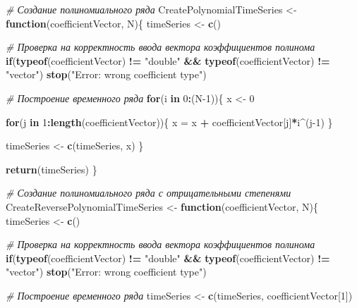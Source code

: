 \documentclass[
]{article}
\newenvironment{Shaded}{\begin{snugshade}}{\end{snugshade}}
\newcommand{\CommentTok}[1]{\textcolor[rgb]{0.56,0.35,0.01}{\textit{#1}}}
\newcommand{\ControlFlowTok}[1]{\textcolor[rgb]{0.13,0.29,0.53}{\textbf{#1}}}
\newcommand{\DecValTok}[1]{\textcolor[rgb]{0.00,0.00,0.81}{#1}}
\newcommand{\FunctionTok}[1]{\textcolor[rgb]{0.13,0.29,0.53}{\textbf{#1}}}
\newcommand{\NormalTok}[1]{#1}
\newcommand{\OtherTok}[1]{\textcolor[rgb]{0.56,0.35,0.01}{#1}}
\newcommand{\SpecialCharTok}[1]{\textcolor[rgb]{0.81,0.36,0.00}{\textbf{#1}}}
\newcommand{\StringTok}[1]{\textcolor[rgb]{0.31,0.60,0.02}{#1}}
\begin{document}
\begin{Shaded}
\begin{Highlighting}[]
\CommentTok{\# Создание полиномиального ряда}
\NormalTok{CreatePolynomialTimeSeries }\OtherTok{\textless{}{-}} \ControlFlowTok{function}\NormalTok{(coefficientVector, N)\{}
\NormalTok{  timeSeries }\OtherTok{\textless{}{-}} \FunctionTok{c}\NormalTok{()}
  
  \CommentTok{\# Проверка на корректность ввода вектора коэффициентов полинома}
  \ControlFlowTok{if}\NormalTok{(}\FunctionTok{typeof}\NormalTok{(coefficientVector) }\SpecialCharTok{!=} \StringTok{"double"} \SpecialCharTok{\&\&} \FunctionTok{typeof}\NormalTok{(coefficientVector) }\SpecialCharTok{!=} \StringTok{"vector"}\NormalTok{) }\FunctionTok{stop}\NormalTok{(}\StringTok{"Error: wrong coefficient type"}\NormalTok{)}
  
  \CommentTok{\# Построение временного ряда}
  \ControlFlowTok{for}\NormalTok{(i }\ControlFlowTok{in} \DecValTok{0}\SpecialCharTok{:}\NormalTok{(N}\DecValTok{{-}1}\NormalTok{))\{}
\NormalTok{    x }\OtherTok{\textless{}{-}} \DecValTok{0}
    
    \ControlFlowTok{for}\NormalTok{(j }\ControlFlowTok{in} \DecValTok{1}\SpecialCharTok{:}\FunctionTok{length}\NormalTok{(coefficientVector))\{}
\NormalTok{      x }\OtherTok{=}\NormalTok{ x }\SpecialCharTok{+}\NormalTok{ coefficientVector[j]}\SpecialCharTok{*}\NormalTok{i}\SpecialCharTok{\^{}}\NormalTok{(j}\DecValTok{{-}1}\NormalTok{)}
\NormalTok{    \}}
    
\NormalTok{    timeSeries }\OtherTok{\textless{}{-}} \FunctionTok{c}\NormalTok{(timeSeries, x)}
\NormalTok{  \}}
  
  \FunctionTok{return}\NormalTok{(timeSeries)}
\NormalTok{\}}


\CommentTok{\# Создание полиномиального ряда с отрицательными степенями}
\NormalTok{CreateReversePolynomialTimeSeries }\OtherTok{\textless{}{-}} \ControlFlowTok{function}\NormalTok{(coefficientVector, N)\{}
\NormalTok{  timeSeries }\OtherTok{\textless{}{-}} \FunctionTok{c}\NormalTok{()}
  
  \CommentTok{\# Проверка на корректность ввода вектора коэффициентов полинома}
  \ControlFlowTok{if}\NormalTok{(}\FunctionTok{typeof}\NormalTok{(coefficientVector) }\SpecialCharTok{!=} \StringTok{"double"} \SpecialCharTok{\&\&} \FunctionTok{typeof}\NormalTok{(coefficientVector) }\SpecialCharTok{!=} \StringTok{"vector"}\NormalTok{) }\FunctionTok{stop}\NormalTok{(}\StringTok{"Error: wrong coefficient type"}\NormalTok{)}
  
  \CommentTok{\# Построение временного ряда}
\NormalTok{  timeSeries }\OtherTok{\textless{}{-}} \FunctionTok{c}\NormalTok{(timeSeries, coefficientVector[}\DecValTok{1}\NormalTok{])}
  

\end{Highlighting}
\end{Shaded}
\end{document}
